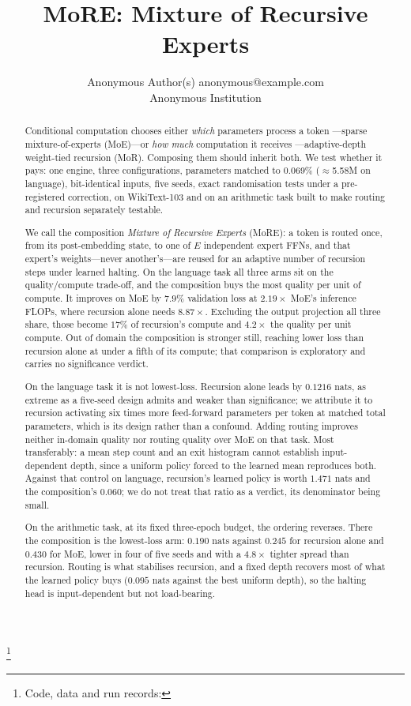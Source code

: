 \documentclass{article}
\title{MoRE: Mixture of Recursive Experts}
\author{\name Anonymous Author(s) \email anonymous@example.com \\
        \addr Anonymous Institution}
\makeatletter
\newcommand{\blfootnote}[1]{%
  \begingroup
  \renewcommand{\thefootnote}{}%
  \renewcommand{\@makefnmark}{}%
  \renewcommand{\footnotesize}{\normalsize}%
  \long\def\@makefntext##1{\parindent 0pt\noindent ##1}%
  \footnote{#1}%
  \addtocounter{footnote}{-1}%
  \endgroup}
\makeatother
\begin{document}
\maketitle

\blfootnote{Code, data and run records: \anonrepo}

\begin{abstract}
Conditional computation chooses either \emph{which} parameters process a token
---sparse mixture-of-experts (MoE)---or \emph{how much} computation it receives
---adaptive-depth weight-tied recursion (MoR). Composing them should inherit
both. We test whether it pays: one engine, three configurations, parameters
matched to 0.069\% ($\approx$5.58M on language), bit-identical inputs, five
seeds, exact randomisation tests under a pre-registered correction, on
WikiText-103 and on an arithmetic task built to make routing and recursion
separately testable.

We call the composition \emph{Mixture of Recursive Experts} (MoRE): a token is
routed once, from its post-embedding state, to one of $E$ independent expert
FFNs, and that expert's weights---never another's---are reused for an adaptive
number of recursion steps under learned halting. On the language task all three
arms sit on the quality/compute trade-off, and the composition buys the most
quality per unit of compute. It improves on MoE by $7.9\%$ validation loss at
$2.19\times$ MoE's inference FLOPs, where recursion alone needs $8.87\times$.
Excluding the output projection all three share, those become $17\%$ of
recursion's compute and $4.2\times$ the quality per unit compute. Out of domain
the composition is stronger still, reaching lower loss
than recursion alone at under a fifth of its compute; that comparison is
exploratory and carries no significance verdict.

On the language task it is not lowest-loss. Recursion alone leads by $0.1216$
nats, as extreme as a five-seed design admits and weaker than significance; we
attribute it to recursion activating six times more feed-forward parameters per
token at matched total parameters, which is its design rather than a confound.
Adding routing improves neither in-domain quality nor routing quality over MoE
on that task. Most transferably: a mean step count and an exit histogram cannot
establish input-dependent depth, since a uniform policy forced to the learned
mean reproduces both. Against that control on language, recursion's learned
policy is worth $1.471$ nats and the composition's $0.060$; we do not treat that
ratio as a verdict, its denominator being small.

On the arithmetic task, at its fixed three-epoch budget, the ordering reverses.
There the composition is the lowest-loss arm: $0.190$ nats against $0.245$ for
recursion alone and $0.430$ for MoE, lower in four of five seeds and with a
$4.8\times$ tighter spread than recursion. Routing is what stabilises recursion, and a fixed depth recovers most
of what the learned policy buys ($0.095$ nats against the best uniform depth),
so the halting head is input-dependent but not load-bearing.
\end{abstract}
\end{document}

